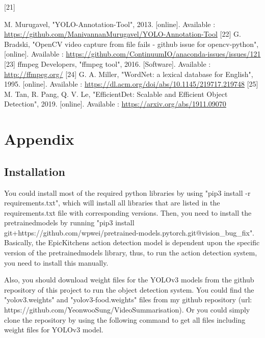 \documentclass{article}
\begin{document}
\newline
\hypertarget{ref21}{[21]} M. Murugavel, "YOLO-Annotation-Tool", 2013. [online]. Available :  \url{https://github.com/ManivannanMurugavel/YOLO-Annotation-Tool}
\newline
\hypertarget{ref22}{[22]} G. Bradski, "OpenCV video capture from file fails - github issue for opencv-python", [online]. Available : \url{https://github.com/ContinuumIO/anaconda-issues/issues/121}
\newline
\hypertarget{ref23}{[23]} ffmpeg Developers, "ffmpeg tool", 2016. [Software]. Available : \url{http://ffmpeg.org/}
\newline
\hypertarget{ref24}{[24]} G. A. Miller, "WordNet: a lexical database for English", 1995. [online]. Available : \url{https://dl.acm.org/doi/abs/10.1145/219717.219748}
\newline
\hypertarget{ref25}{[25]} M. Tan, R. Pang, Q. V. Le, "EfficientDet: Scalable and Efficient Object Detection", 2019. [online]. Available : \url{https://arxiv.org/abs/1911.09070}
\newline

\newpage

\section{Appendix}

\subsection{Installation}

You could install most of the required python libraries by using "pip3 install -r requirements.txt", which will install all libraries that are listed in the requirements.txt file with corresponding versions. Then, you need to install the pretrainedmodels by running "pip3 install git+https://github.com/wpwei/pretrained-models.pytorch.git@vision\_bug\_fix". Basically, the EpicKitchens action detection model is dependent upon the specific version of the pretrainedmodels library, thus, to run the action detection system, you need to install this manually.

Also, you should download weight files for the YOLOv3 models from the github repository of this project to run the object detection system. You could find the "yolov3.weights" and "yolov3-food.weights" files from my github repository (url: https://github.com/YeonwooSung/VideoSummarisation). Or you could simply clone the repository by using the following command to get all files including weight files for YOLOv3 model.
\end{document}
